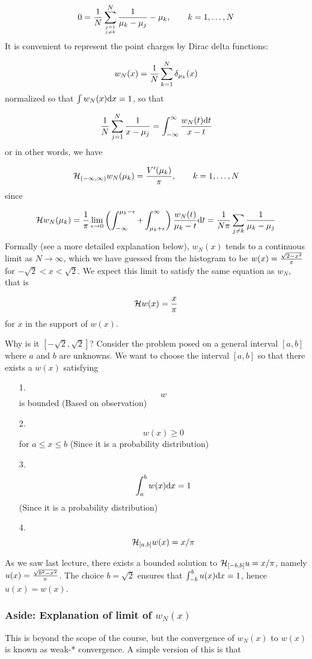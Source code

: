 \documentclass[12pt,a4paper]{article}
\def\D{ {\rm d} }
\def\HH{ {\cal H} }
\def\dx{\D x}
\def\dt{\D t}
\begin{document}
\[
0 = {1 \over N} \sum_{j=1 \atop j \neq k}^N {1 \over \mu_k -\mu_j} -  \mu_k, \qquad  k = 1, \ldots, N
\]
It is convenient to represent the point charges by Dirac delta functions:

\[
    w_N(x) = {1 \over N} \sum_{k=1}^N \delta_{\mu_k}(x)
\]
normalized so that $\int w_N(x) \dx = 1$, so that

\[
    {1 \over N} \sum_{j=1}^N {1 \over  x -\mu_j} = \int_{-\infty}^\infty {w_N(t) \dt \over x - t}
\]
or in other words, we have

\[
 \HH_{(-\infty,\infty)} w_N(\mu_k) = {V'(\mu_k) \over \pi}, \qquad  k = 1, \ldots, N
\]
since

\[
\HH w_N (\mu_k) = {1 \over \pi} \lim_{\epsilon\rightarrow 0} \left(\int_{-\infty}^{\mu_k-\epsilon} + \int_{\mu_k+\epsilon}^\infty\right) {w_N(t)  \over  \mu_k-t} \dt  = {1 \over N\pi} \sum_{j \neq k} {1 \over \mu_k - \mu_j}
\]
Formally (see a more detailed explanation below), $w_N(x)$ tends to a continuous limit as $N\rightarrow \infty$, which we have guessed from the histogram to be $w(x) = { \sqrt{2-x^2}  \over \pi}$ for $-\sqrt 2 < x < \sqrt2$. We expect this limit to satisfy the same equation as $w_N$, that is

\[
 \HH w(x) = {x \over \pi}
\]
for $x$ in the support of $w(x)$.

Why is it $[-\sqrt 2, \sqrt 2]$? Consider the problem posed on a general interval $[a,b]$ where $a$ and $b$ are unknowns. We  want to choose the interval $[a,b]$ so that there exists a $w(x)$  satisfying

\begin{itemize}
\item[1. ] \[
w
\]
is bounded (Based on observation)


\item[2. ] \[
w(x) \geq 0
\]
for $a \leq x \leq b$ (Since it is a probability distribution)


\item[3. ] \[
\int_a^b w(x) \dx = 1
\]
(Since it is a probability distribution)


\item[4. ] \[
\HH_{[a,b]} w(x) = x/\pi
\]
\end{itemize}
As we saw last lecture, there exists a bounded solution to $\HH_{[-b,b]} u =  x/\pi$, namely  $u(x) = { \sqrt{b^2-x^2} \over \pi}$. The choice $b = \sqrt{2}$ ensures that $\int_{-b}^b u(x) \dx = 1$, hence $u(x) = w(x)$.

\subsubsection{Aside: Explanation of limit of $w_N(x)$}
This is beyond the scope of the course, but the convergence of $w_N(x)$ to $w(x)$ is known as weak-* convergence. A simple version of this is that
\end{document}

